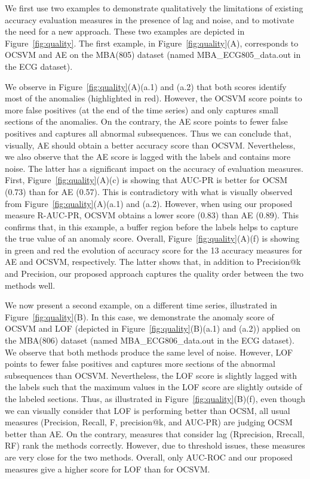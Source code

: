 We first use two examples to demonstrate qualitatively the limitations of existing accuracy evaluation measures in the presence of lag and noise, and to motivate the need for a new approach. 
These two examples are depicted in Figure~\ref{fig:quality}. 
The first example, in Figure~\ref{fig:quality}(A), corresponds to OCSVM and AE on the MBA(805) dataset (named MBA\_ECG805\_data.out in the ECG dataset). 

We observe in Figure~\ref{fig:quality}(A)(a.1) and (a.2) that both scores identify most of the anomalies (highlighted in red). However, the OCSVM score points to more false positives (at the end of the time series) and only captures small sections of the anomalies. On the contrary, the AE score points to fewer false positives and captures all abnormal subsequences. Thus we can conclude that, visually, AE should obtain a better accuracy score than OCSVM. Nevertheless, we also observe that the AE score is lagged with the labels and contains more noise. The latter has a significant impact on the accuracy of evaluation measures. First, Figure~\ref{fig:quality}(A)(c) is showing that AUC-PR is better for OCSM (0.73) than for AE (0.57). This is contradictory with what is visually observed from Figure~\ref{fig:quality}(A)(a.1) and (a.2). However, when using our proposed measure R-AUC-PR, OCSVM obtains a lower score (0.83) than AE (0.89). This confirms that, in this example, a buffer region before the labels helps to capture the true value of an anomaly score. Overall, Figure~\ref{fig:quality}(A)(f) is showing in green and red the evolution of accuracy score for the 13 accuracy measures for AE and OCSVM, respectively. The latter shows that, in addition to Precision@k and Precision, our proposed approach captures the quality order between the two methods well.

We now present a second example, on a different time series, illustrated in Figure~\ref{fig:quality}(B). 
In this case, we demonstrate the anomaly score of OCSVM and LOF (depicted in Figure~\ref{fig:quality}(B)(a.1) and (a.2)) applied on the MBA(806) dataset (named MBA\_ECG806\_data.out in the ECG dataset). 
We observe that both methods produce the same level of noise. However, LOF points to fewer false positives and captures more sections of the abnormal subsequences than OCSVM. 
Nevertheless, the LOF score is slightly lagged with the labels such that the maximum values in the LOF score are slightly outside of the labeled sections. 
Thus, as illustrated in Figure~\ref{fig:quality}(B)(f), even though we can visually consider that LOF is performing better than OCSM, all usual measures (Precision, Recall, F, precision@k, and AUC-PR) are judging OCSM better than AE. On the contrary, measures that consider lag (Rprecision, Rrecall, RF) rank the methods correctly. 
However, due to threshold issues, these measures are very close for the two methods. Overall, only AUC-ROC and our proposed measures give a higher score for LOF than for OCSVM.

